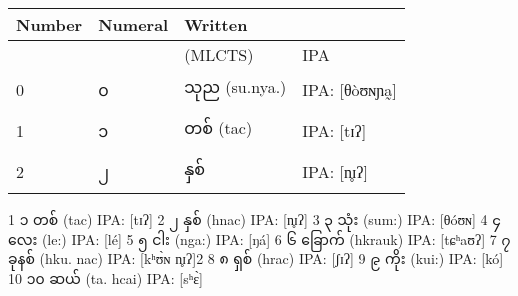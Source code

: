 {\myanmar
\begin{tabular}{l l l l}
\toprule
Number         &Numeral	 &Written     &\\
\midrule
               &	          &(MLCTS)     &IPA \\
0	            &၀	          &သုည (su.nya.) & IPA: [θòʊɴɲa̰]\\
1	            & ၁	       &တစ် (tac)	 &IPA: [tɪʔ]\\
2              &၂          &နှစ်        &IPA: [n̥ɪʔ]\\
\bottomrule
\end{tabular}


	
1	၁	တစ်
(tac)	IPA: [tɪʔ]
2	၂	နှစ်
(hnac)	IPA: [n̥ɪʔ]
3	၃	သုံး
(sum:)	IPA: [θóʊɴ]
4	၄	လေး
(le:)	IPA: [lé]
5	၅	ငါး
(nga:)	IPA: [ŋá]
6	၆	ခြောက်
(hkrauk)	IPA: [tɕʰaʊʔ]
7	၇	ခုနစ်
(hku. nac)	IPA: [kʰʊ̀ɴ n̥ɪʔ]2
8	၈	ရှစ်
(hrac)	IPA: [ʃɪʔ]
9	၉	ကိုး
(kui:)	IPA: [kó]
10	၁၀	ဆယ်
(ta. hcai)	IPA: [sʰɛ̀]
}


